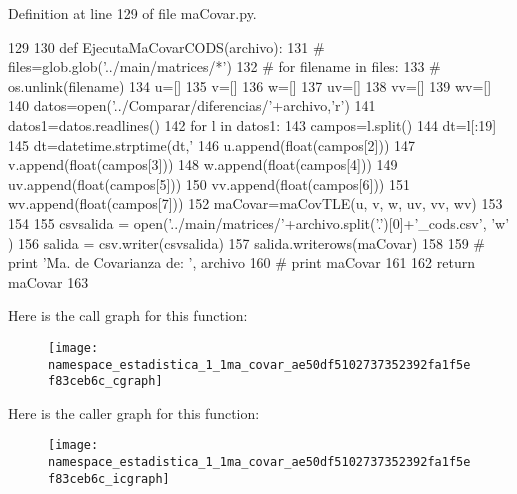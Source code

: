 \-Definition at line 129 of file ma\-Covar.\-py.


\begin{DoxyCode}
129 
130 def EjecutaMaCovarCODS(archivo):
131 #     files=glob.glob('../main/matrices/*')
132 #     for filename in files:
133 #         os.unlink(filename)
134     u=[]
135     v=[]
136     w=[]
137     uv=[]
138     vv=[]
139     wv=[]
140     datos=open('../Comparar/diferencias/'+archivo,'r')
141     datos1=datos.readlines()
142     for l in datos1:
143         campos=l.split()
144         dt=l[:19]
145         dt=datetime.strptime(dt,'%
146         u.append(float(campos[2]))
147         v.append(float(campos[3]))
148         w.append(float(campos[4]))
149         uv.append(float(campos[5]))
150         vv.append(float(campos[6]))
151         wv.append(float(campos[7]))
152     maCovar=maCovTLE(u, v, w, uv, vv, wv)
153     
154 
155     csvsalida = open('../main/matrices/'+archivo.split('.')[0]+'_cods.csv', 'w'
      )
156     salida = csv.writer(csvsalida)
157     salida.writerows(maCovar)
158     
159 #     print 'Ma. de Covarianza de: ', archivo    
160 #     print maCovar
161     
162     return maCovar
163     
    \end{DoxyCode}


\-Here is the call graph for this function\-:\nopagebreak
\begin{figure}[H]
\begin{center}
\leavevmode
\texttt{[image: namespace\_estadistica\_1\_1ma\_covar\_ae50df5102737352392fa1f5ef83ceb6c\_cgraph]}
\end{center}
\end{figure}




\-Here is the caller graph for this function\-:\nopagebreak
\begin{figure}[H]
\begin{center}
\leavevmode
\texttt{[image: namespace\_estadistica\_1\_1ma\_covar\_ae50df5102737352392fa1f5ef83ceb6c\_icgraph]}
\end{center}
\end{figure}


